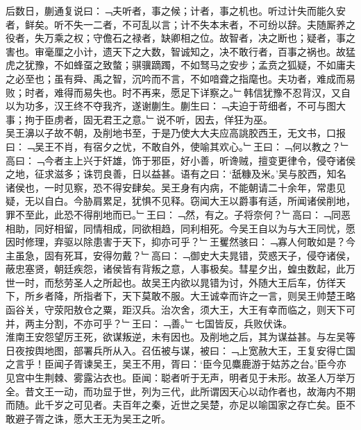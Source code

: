 后数日，蒯通复说曰：﹁夫听者，事之候；计者，事之机也。听过计失而能久安者，鲜矣。听不失一二者，不可乱以言；计不失本末者，不可纷以辞。夫随厮养之役者，失万乘之权；守儋石之禄者，缺卿相之位。故智者，决之断也；疑者，事之害也。审毫厘之小计，遗天下之大数，智诚知之，决不敢行者，百事之祸也。故猛虎之犹豫，不如蜂虿之致螫；骐骥蹢躅，不如驽马之安步；孟贲之狐疑，不如庸夫之必至也；虽有舜、禹之智，沉吟而不言，不如喑聋之指麾也。夫功者，难成而易败；时者，难得而易失也。时不再来，愿足下详察之。﹂韩信犹豫不忍背汉，又自以为功多，汉王终不夺我齐，遂谢蒯生。蒯生曰：﹁夫迫于苛细者，不可与图大事；拘于臣虏者，固无君王之意。﹂说不听，因去，佯狂为巫。
\\
吴王濞以子故不朝，及削地书至，于是乃使大大夫应高誂胶西王，无文书，口报曰：﹁吴王不肖，有宿夕之忧，不敢自外，使喻其欢心。﹂王曰：﹁何以教之？﹂高曰：﹁今者主上兴于奸雄，饰于邪臣，好小善，听谗贼，擅变更律令，侵夺诸侯之地，征求滋多；诛罚良善，日以益甚。语有之曰：‘舐糠及米。’吴与胶西，知名诸侯也，一时见察，恐不得安肆矣。吴王身有内病，不能朝请二十余年，常患见疑，无以自白。今胁肩累足，犹惧不见释。窃闻大王以爵事有适，所闻诸侯削地，罪不至此，此恐不得削地而已。﹂王曰：﹁然，有之。子将奈何？﹂高曰：﹁同恶相助，同好相留，同情相成，同欲相趋，同利相死。今吴王自以为与大王同忧，愿因时修理，弃驱以除患害于天下，抑亦可乎？﹂王矍然骇曰：﹁寡人何敢如是？今主虽急，固有死耳，安得勿戴？﹂高曰：﹁御史大夫晁错，荧惑天子，侵夺诸侯，蔽忠塞贤，朝廷疾怨，诸侯皆有背叛之意，人事极矣。彗星夕出，蝗虫数起，此万世一时，而愁劳圣人之所起也。故吴王内欲以晁错为讨，外随大王后车，仿徉天下，所乡者降，所指者下，天下莫敢不服。大王诚幸而许之一言，则吴王帅楚王略函谷关，守荥阳敖仓之粟，距汉兵。治次舍，须大王，大王有幸而临之，则天下可并，两主分割，不亦可乎？﹂王曰：﹁善。﹂七国皆反，兵败伏诛。
\\
淮南王安怨望厉王死，欲谋叛逆，未有因也。及削地之后，其为谋益甚。与左吴等日夜按舆地图，部署兵所从入。召伍被与谋，被曰：﹁上宽赦大王，王复安得亡国之言乎！臣闻子胥谏吴王，吴王不用，胥曰：‘臣今见麋鹿游于姑苏之台。’臣今亦见宫中生荆棘、雾露沾衣也。臣闻：聪者听于无声，明者见于未形。故圣人万举万全。昔文王一动，而功显于世，列为三代，此所谓因天心以动作者也，故海内不期而随。此千岁之可见者。夫百年之秦，近世之吴楚，亦足以喻国家之存亡矣。臣不敢避子胥之诛，愿大王无为吴王之听。\\
